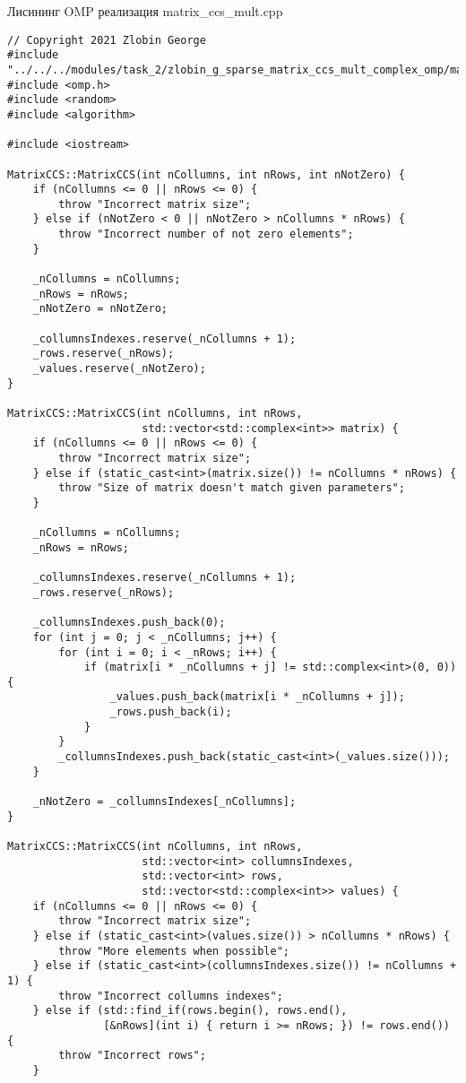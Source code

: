 \documentclass{report}
\begin{document}
Лисининг OMP реализация matrix\_ccs\_mult.cpp
\begin{lstlisting}
// Copyright 2021 Zlobin George
#include "../../../modules/task_2/zlobin_g_sparse_matrix_ccs_mult_complex_omp/matrix_ccs_mult.h"
#include <omp.h>
#include <random>
#include <algorithm>

#include <iostream>

MatrixCCS::MatrixCCS(int nCollumns, int nRows, int nNotZero) {
    if (nCollumns <= 0 || nRows <= 0) {
        throw "Incorrect matrix size";
    } else if (nNotZero < 0 || nNotZero > nCollumns * nRows) {
        throw "Incorrect number of not zero elements";
    }

    _nCollumns = nCollumns;
    _nRows = nRows;
    _nNotZero = nNotZero;

    _collumnsIndexes.reserve(_nCollumns + 1);
    _rows.reserve(_nRows);
    _values.reserve(_nNotZero);
}

MatrixCCS::MatrixCCS(int nCollumns, int nRows,
                     std::vector<std::complex<int>> matrix) {
    if (nCollumns <= 0 || nRows <= 0) {
        throw "Incorrect matrix size";
    } else if (static_cast<int>(matrix.size()) != nCollumns * nRows) {
        throw "Size of matrix doesn't match given parameters";
    }

    _nCollumns = nCollumns;
    _nRows = nRows;

    _collumnsIndexes.reserve(_nCollumns + 1);
    _rows.reserve(_nRows);

    _collumnsIndexes.push_back(0);
    for (int j = 0; j < _nCollumns; j++) {
        for (int i = 0; i < _nRows; i++) {
            if (matrix[i * _nCollumns + j] != std::complex<int>(0, 0)) {
                _values.push_back(matrix[i * _nCollumns + j]);
                _rows.push_back(i);
            }
        }
        _collumnsIndexes.push_back(static_cast<int>(_values.size()));
    }

    _nNotZero = _collumnsIndexes[_nCollumns];
}

MatrixCCS::MatrixCCS(int nCollumns, int nRows,
                     std::vector<int> collumnsIndexes,
                     std::vector<int> rows,
                     std::vector<std::complex<int>> values) {
    if (nCollumns <= 0 || nRows <= 0) {
        throw "Incorrect matrix size";
    } else if (static_cast<int>(values.size()) > nCollumns * nRows) {
        throw "More elements when possible";
    } else if (static_cast<int>(collumnsIndexes.size()) != nCollumns + 1) {
        throw "Incorrect collumns indexes";
    } else if (std::find_if(rows.begin(), rows.end(),
               [&nRows](int i) { return i >= nRows; }) != rows.end()) {
        throw "Incorrect rows";
    }


\end{lstlisting}
\end{document}
